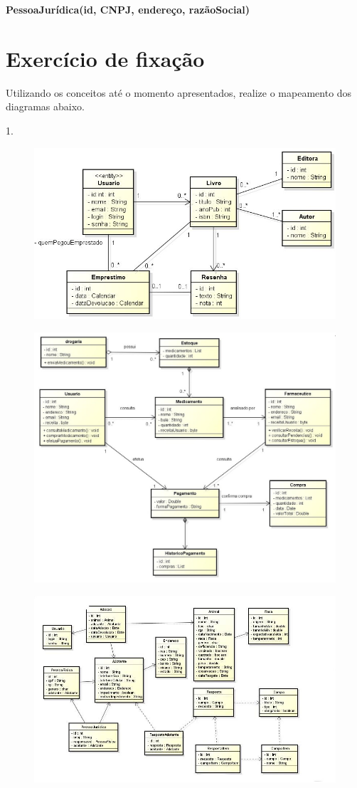 \textbf{PessoaJurídica(id, CNPJ, endereço, razãoSocial)}


\section{Exercício de fixação}

Utilizando os conceitos até o momento apresentados, realize o mapeamento dos diagramas abaixo.

1. 
\begin{figure}[H]
	\centering
	\includegraphics[scale=0.7]{imagens/dominio1.jpg}
\end{figure}

\begin{figure}[H]
	\centering
	\includegraphics[scale=0.5]{imagens/farmacia_classdiagram.jpg}
\end{figure}

\begin{figure}[H]
	\centering
	\includegraphics[scale=0.6]{imagens/diagrama-de-classe-2.jpg}
\end{figure}